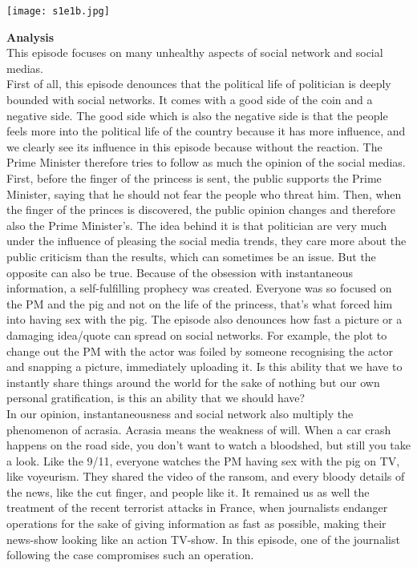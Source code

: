 \documentclass{article}
\begin{document}
\begin{center}
\texttt{[image: s1e1b.jpg]}
\end{center}

\textbf{Analysis}\\
This episode focuses on many unhealthy aspects of social network and social medias.\\
First of all, this episode denounces that the political life of politician is deeply bounded with social networks. It comes with a good side of the coin and a negative side. The good side which is also the negative side is that the people feels more into the political life of the country because it has more influence, and we clearly see its influence in this episode because without the reaction. The Prime Minister therefore tries to follow as much the opinion of the social medias. First, before the finger of the princess is sent, the public supports the Prime Minister, saying that he should not fear the people who threat him. Then, when the finger of the princes is discovered, the public opinion changes and therefore also the Prime Minister's. The idea behind it is that politician are very much under the influence of pleasing the social media trends, they care more about the public criticism than the results, which can sometimes be an issue. But the opposite can also be true. Because of the obsession with instantaneous information, a self-fulfilling prophecy was created. Everyone was so focused on the PM and the pig and not on the life of the princess, that's what forced him into having sex with the pig.
The episode also denounces how fast a picture or a damaging idea/quote can spread on social networks. For example, the plot to change out the PM with the actor was foiled by someone recognising the actor and snapping a picture, immediately uploading it. Is this ability that we have to instantly share things around the world for the sake of nothing but our own personal gratification, is this an ability that we should have?
\\
In our opinion, instantaneousness and social network also multiply the phenomenon of acrasia. Acrasia means the weakness of will. When a car crash happens on the road side, you don't want to watch a bloodshed, but still you take a look. Like the 9/11, everyone watches the PM having sex with the pig on TV, like voyeurism. They shared the video of the ransom, and every bloody details of the news, like the cut finger, and people like it. It remained us as well the treatment of the recent terrorist attacks in France, when journalists endanger operations for the sake of giving information as fast as possible, making their news-show looking like an action TV-show. In this episode, one of the journalist following the case compromises such an operation.
\end{document}
